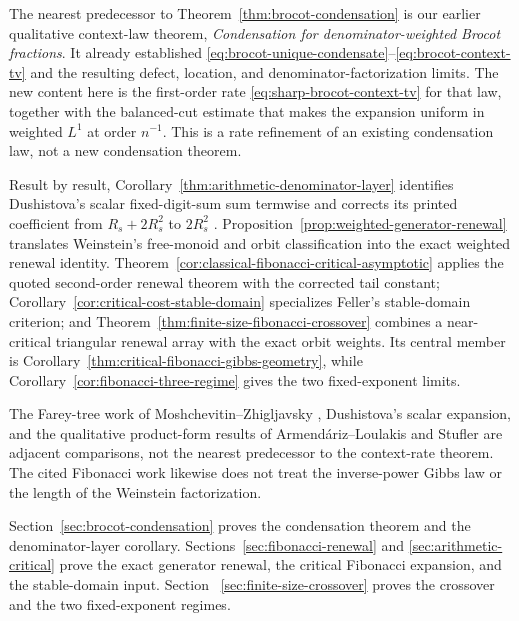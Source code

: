 The nearest predecessor to Theorem~\ref{thm:brocot-condensation} is our
earlier qualitative context-law theorem, \emph{Condensation for
denominator-weighted Brocot fractions}.  It already established
\eqref{eq:brocot-unique-condensate}--\eqref{eq:brocot-context-tv} and the
resulting defect, location, and denominator-factorization limits.  The new
content here is the first-order rate \eqref{eq:sharp-brocot-context-tv} for
that law, together with the balanced-cut estimate that makes the expansion
uniform in weighted \(L^1\) at order \(n^{-1}\).  This is a rate refinement
of an existing condensation law, not a new condensation theorem.

Result by result, Corollary~\ref{thm:arithmetic-denominator-layer} identifies
Dushistova's scalar fixed-digit-sum sum termwise and corrects its printed
coefficient from \(R_s+2R_s^2\) to \(2R_s^2\) \cite{Dushistova2007}.
Proposition~\ref{prop:weighted-generator-renewal} translates Weinstein's
free-monoid and orbit classification \cite{Weinstein2016} into the exact
weighted renewal identity.  Theorem~\ref{cor:classical-fibonacci-critical-asymptotic}
applies the quoted second-order renewal theorem with the corrected tail
constant; Corollary~\ref{cor:critical-cost-stable-domain} specializes
Feller's stable-domain criterion; and
Theorem~\ref{thm:finite-size-fibonacci-crossover} combines a near-critical
triangular renewal array with the exact orbit weights.  Its central member
is Corollary~\ref{thm:critical-fibonacci-gibbs-geometry}, while
Corollary~\ref{cor:fibonacci-three-regime} gives the two fixed-exponent
limits.

The Farey-tree work of Moshchevitin--Zhigljavsky
\cite{MoshchevitinZhigljavsky2004}, Dushistova's scalar expansion, and the
qualitative product-form results of Armend\'ariz--Loulakis and Stufler
\cite{ArmendarizLoulakis2011,Stufler2020} are adjacent comparisons, not the
nearest predecessor to the context-rate theorem.  The cited Fibonacci work
\cite{Zeckendorf1972,Carlitz1968,Berstel2001,ChowSlattery2021,ChowJones2024,
Sanna2025,Kempton2023} likewise does not treat the inverse-power Gibbs law or
the length of the Weinstein factorization.

Section~\ref{sec:brocot-condensation} proves the condensation theorem and
the denominator-layer corollary.  Sections~\ref{sec:fibonacci-renewal} and
\ref{sec:arithmetic-critical} prove the exact generator renewal, the critical
Fibonacci expansion, and the stable-domain input.  Section~
\ref{sec:finite-size-crossover} proves the crossover and the two
fixed-exponent regimes.
